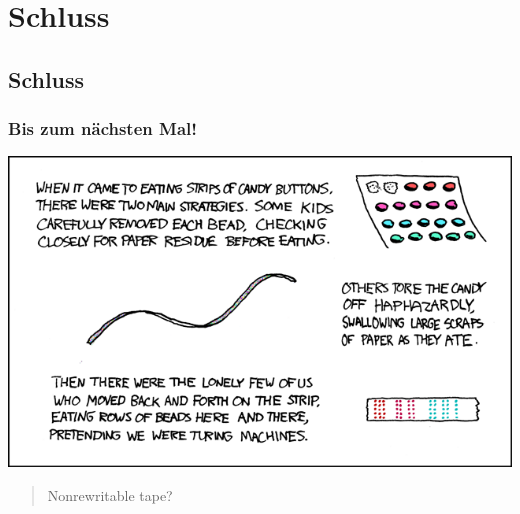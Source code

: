 \section{Schluss}
\subsection{Schluss}

\begin{frame}
\frametitle{Bis zum nächsten Mal!}
\begin{center}
  \includegraphics[height=0.8 \textheight]{images/xkcd_205.png} 
\end{center}

\begin{quote}\tiny{Nonrewritable tape?}
\end{quote}
\end{frame}

